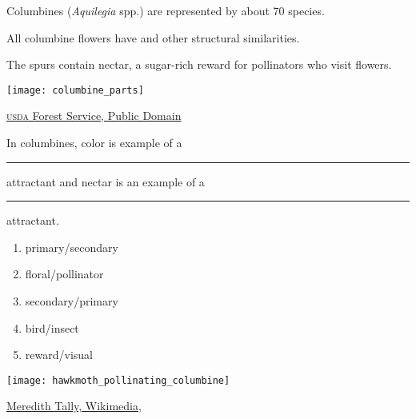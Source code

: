 \documentclass[t,hidelinks]{beamer}
\newcommand{\ques}[1]{\highlight{\textsc{q#1:}}}
\begin{document}
%
\begin{frame}[t]{Columbines (\textit{Aquilegia} spp.) are represented by about 70 species.}
	
	\begin{multicols}{2}
	\hangpara All columbine flowers have  and other structural similarities.
	
	\hangpara The spurs contain nectar, a sugar-rich reward for pollinators who visit flowers.  

	\columnbreak
	
		\texttt{[image: columbine\_parts]}
	\end{multicols}
	
	\vfilll
	
	\hfill \tiny \href{https://www.fs.fed.us/wildflowers/beauty/columbines/flower.shtml}{\textsc{usda} Forest Service, Public Domain}
\end{frame}
%
\begin{frame}[t]{\ques7 In columbines, color is example of a \rule{0.5in}{0.4pt} attractant and nectar is an example of a \rule{0.5in}{0.4pt} attractant.}

	\begin{multicols}{2}
	\begin{enumerate}
		\item primary/secondary
		\item floral/pollinator
		\item \alert<2>{secondary/primary}
		\item bird/insect
		\item reward/visual
	\end{enumerate}

	\columnbreak
	
		\texttt{[image: hawkmoth\_pollinating\_columbine]}
	\end{multicols}
	
	\vfilll
	
	\hfill \tiny \href{https://commons.wikimedia.org/wiki/File:Whitelined_Sphinx_Hummingbird_Moth_Colorado.JPG}{Meredith Tally, Wikimedia, }
\end{frame}
%
\end{document}
